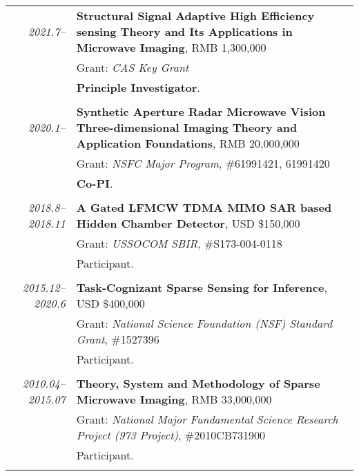 \documentclass[paper=a4,fontsize=11pt]{scrartcl}
\begin{document}
\begin{longtable}{r|p{12cm}}
	\emph{2021.7--} & \textbf{Structural Signal Adaptive High Efficiency sensing Theory and Its Applications in Microwave Imaging}, RMB 1,300,000 \\
	& Grant: \emph{CAS Key Grant}\\
	& \textbf{Principle Investigator}.\\
	\multicolumn{2}{c}{} \\
	
	\emph{2020.1--} & \textbf{Synthetic Aperture Radar Microwave Vision Three-dimensional Imaging Theory and Application Foundations}, RMB 20,000,000 \\
	& Grant: \emph{NSFC Major Program}, \#61991421, 61991420\\
	& \textbf{Co-PI}.\\
	\multicolumn{2}{c}{} \\
	
	\emph{2018.8--2018.11} & \textbf{A Gated LFMCW TDMA MIMO SAR based Hidden Chamber Detector}, USD \$150,000 \\
	& Grant: \emph{USSOCOM SBIR}, \#S173-004-0118\\
	& Participant.\\
	\multicolumn{2}{c}{} \\
	
	\emph{2015.12--2020.6} & \textbf{Task-Cognizant Sparse Sensing for Inference}, USD \$400,000 \\
	& Grant: \emph{National Science Foundation (NSF) Standard Grant}, \#1527396\\
	& Participant.\\
	\multicolumn{2}{c}{} \\
	
	
	
	\emph{2010.04--2015.07} & \textbf{Theory, System and Methodology of Sparse Microwave Imaging}, RMB 33,000,000 \\
	& Grant: \emph{National Major Fundamental Science Research Project (973 Project)}, \#2010CB731900\\
	& Participant.\\
	\multicolumn{2}{c}{} \\
	

\end{longtable}
\end{document}
